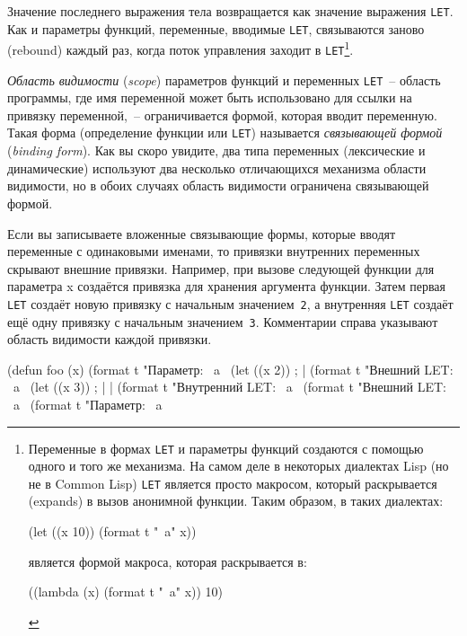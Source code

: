 Значение последнего выражения тела возвращается как значение выражения \lstinline{LET}. Как и
параметры функций, переменные, вводимые \lstinline{LET}, связываются заново (rebound) каждый
раз, когда поток управления заходит в \lstinline{LET}\footnote{Переменные в формах \lstinline{LET} и
параметры функций создаются с помощью одного и того же механизма. На самом деле в
некоторых диалектах Lisp (но не в Common Lisp) \lstinline{LET} является просто макросом,
который раскрывается (expands) в вызов анонимной функции. Таким образом, в таких диалектах:

\begin{myverb}
(let ((x 10)) (format t "~a" x))
\end{myverb}


\noindent{}является формой макроса, которая раскрывается в:

\begin{myverb}
((lambda (x) (format t "~a" x)) 10)
\end{myverb}
}.

\textit{Область видимости} (\textit{scope}) параметров функций и переменных
\lstinline{LET}~-- область программы, где имя переменной может быть использовано для ссылки
на привязку переменной,~-- ограничивается формой, которая вводит переменную. Такая форма
(определение функции или \lstinline{LET}) называется \textit{связывающей формой}
(\textit{binding form}). Как вы скоро увидите, два типа переменных (лексические и
динамические) используют два несколько отличающихся механизма области видимости, но в
обоих случаях область видимости ограничена связывающей формой.

Если вы записываете вложенные связывающие формы, которые вводят переменные с одинаковыми
именами, то привязки внутренних переменных скрывают внешние привязки. Например, при вызове
следующей функции для параметра x создаётся привязка для хранения аргумента функции. Затем
первая \lstinline{LET} создаёт новую привязку с начальным значением~\lstinline{2}, а внутренняя
\lstinline{LET} создаёт ещё одну привязку с начальным значением~\lstinline{3}. Комментарии справа
указывают область видимости каждой привязки.

\begin{myverb}
(defun foo (x)
  (format t "Параметр: ~a~%
  (let ((x 2))                             ; |
    (format t "Внешний LET: ~a~%
    (let ((x 3))                           ; | |
      (format t "Внутренний LET: ~a~%
    (format t "Внешний LET: ~a~%
  (format t "Параметр: ~a~%
\end{myverb}

